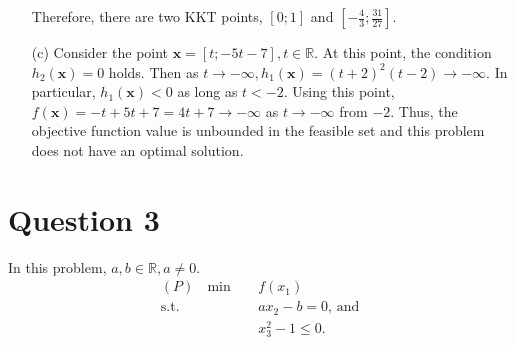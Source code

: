 \documentclass{article}
\begin{document}
\begin{itemize}
Therefore, there are two KKT points, $[0;1]$ and $[-\frac43;\frac{31}{27}]$.

\item[(c)] Consider the point $\mathbf{x}=[t; -5t-7], t\in\mathbb{R}$. At this point, the condition $h_2(\mathbf{x}) = 0$ holds. Then as $t\rightarrow -\infty,   h_1(\mathbf{x}) = (t+2)^2(t-2) \rightarrow - \infty $. In particular, $h_1(\mathbf{x}) < 0$ as long as $t<-2$.
Using this point, $f(\mathbf{x}) = -t+5t+ 7 = 4t+7 \rightarrow-\infty$ as $t\rightarrow-\infty$ from $-2$. Thus, the objective function value is unbounded in the feasible set and this problem does not have an optimal solution.
\end{itemize}
\section*{Question 3}
In this problem, $a, b\in\mathbb{R}, a\neq0$.
\begin{align*}
(P) \ \ \ \min \ \ \ \ & f(x_1)\\
    \text{s.t. } \ \ \ & ax_2-b=0\text{, and}\\
    & x_3^2-1\leq0.
\end{align*}
\end{document}

